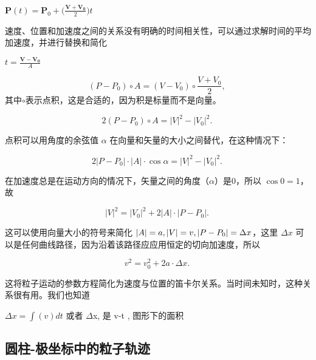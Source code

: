 $\mathbf{P}(t)=\mathbf{P}_{0}+\Big(\frac{\mathbf{V}+\mathbf{V_0}}{2}\Big )t$

速度、位置和加速度之间的关系没有明确的时间相关性，可以通过求解时间的平均加速度，并进行替换和简化

$t=\frac{\mathbf{V}-\mathbf{V_0}}{A}$

\begin{equation}
(P - P_0) \circ A = (V - V_0) \circ \frac{V + V_0}{2},~
\end{equation}
其中$\circ$表示点积，这是合适的，因为积是标量而不是向量。

\begin{equation}
2(P - P_0) \circ A = |V|^2 - |V_0|^2.~
\end{equation}

点积可以用角度的余弦值 $\alpha$ 在向量和矢量的大小之间替代，在这种情况下：

\begin{equation}
2|P - P_0| \cdot |A| \cdot \cos \alpha = |V|^2 - |V_0|^2.~
\end{equation}

在加速度总是在运动方向的情况下，矢量之间的角度（$\alpha$）是0，所以 $\cos 0 = 1$，故

\begin{equation}
|V|^2 = |V_0|^2 + 2|A| \cdot |P - P_0|.~
\end{equation}

这可以使用向量大小的符号来简化 $\\|A\\| = a, \\|V\\| = v, \\|P - P_0\\| = \Delta x$，这里 $\Delta x$ 可以是任何曲线路径，因为沿着该路径应应用恒定的切向加速度，所以

\begin{equation}
v^2 = v_0^2 + 2a \cdot \Delta x.~
\end{equation}

这将粒子运动的参数方程简化为速度与位置的笛卡尔关系。当时间未知时，这种关系很有用。我们也知道

$\Delta x = \int(v)dt$ 或者 $\Delta$x, 是 v-t , 图形下的面积



\subsection{圆柱-极坐标中的粒子轨迹}



